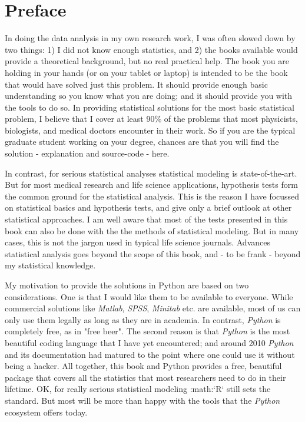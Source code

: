 \chapter*{Preface}

In doing the data analysis in my own research work, I was often slowed down by two things: 1) I did not know enough statistics, and 2) the books available would provide a theoretical background, but no real practical help. The book you are holding in your hands (or on your tablet or laptop) is intended to be the book that would have solved just this problem. It should provide enough basic understanding so you know what you are doing; and it should provide you with the tools to do so. In providing statistical solutions for the most basic statistical problem, I believe that I cover at least 90\% of the problems that most physicists, biologists, and medical doctors encounter in their work. So if you are the typical graduate student working on your degree, chances are that you will find the solution - explanation and source-code - here.

In contrast, for serious statistical analyses statistical modeling is state-of-the-art. But for most medical research and life science applications, hypothesis tests form the common ground for the statistical analysis. This is the reason I have focussed on statistical basics and hypothesis tests, and give only a brief outlook at other statistical approaches. I am well aware that most of the tests presented in this book can also be done with the the methods of statistical modeling. But in many cases, this is not the jargon used in typical life science journals. Advances statistical analysis goes beyond the scope of this book, and - to be frank - beyond my statistical knowledge.

My motivation to provide the solutions in Python are based on two considerations. One is that I would like them to be available to everyone. While commercial solutions like \emph{Matlab}, \emph{SPSS}, \emph{Minitab} etc. are available, most of us can only use them legally as long as they are in academia. In contrast, \emph{Python} is completely free, as in "free beer". The second reason is that \emph{Python} is the most beautiful coding language that I have yet encountered; and around 2010 \emph{Python} and its documentation had matured to
the point where one could use it without being a hacker. All together, this book and Python provides a free, beautiful package that covers all the statistics that most researchers need to do in their lifetime. OK, for really serious statistical modeling :math:`R` still sets the standard.
But most will be more than happy with the tools that the \emph{Python} ecosystem offers today.

